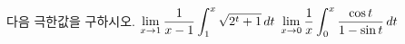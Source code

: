다음 극한값을 구하시오.
 $\displaystyle\lim_{x\to 1}\dfrac{1}{x-1}\int_{1}^{x}\sqrt{2^t+1}\mkern3mu dt$
 $\displaystyle\lim_{x\to 0}\dfrac{1}{x}\int_{0}^{x}\dfrac{\cos t}{1-\sin t}\mkern3mu dt$
